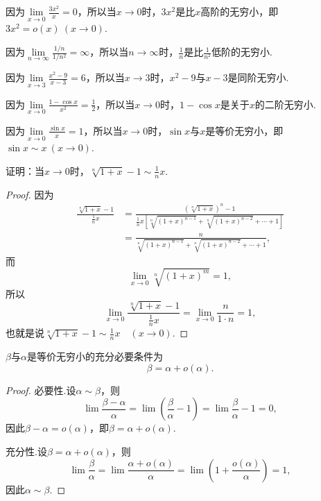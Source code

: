 \begin{example}
因为\(\lim\limits_{x\to0} \frac{3x^2}{x} = 0\)，所以当\(x\to0\)时，\(3x^2\)是比\(x\)高阶的无穷小，即\(3x^2 = o(x)\ (x\to0)\).

因为\(\lim\limits_{n\to\infty} \frac{1/n}{1/n^2} = \infty\)，所以当\(n\to\infty\)时，\(\frac{1}{n}\)是比\(\frac{1}{n^2}\)低阶的无穷小.

因为\(\lim\limits_{x\to3} \frac{x^2-9}{x-3} = 6\)，所以当\(x\to3\)时，\(x^2-9\)与\(x-3\)是同阶无穷小.

因为\(\lim\limits_{x\to0} \frac{1-\cos x}{x^2} = \frac{1}{2}\)，所以当\(x\to0\)时，\(1-\cos x\)是关于\(x\)的二阶无穷小.

因为\(\lim\limits_{x\to0} \frac{\sin x}{x} = 1\)，所以当\(x\to0\)时，\(\sin x\)与\(x\)是等价无穷小，即\(\sin x \sim x\ (x\to0)\).
\end{example}

\begin{example}
证明：当\(x\to0\)时，\(\sqrt[n]{1+x} - 1 \sim \frac{1}{n} x\).
\begin{proof}
因为\begin{align*}
\frac{\sqrt[n]{1+x} - 1}{\frac{1}{n} x}
&= \frac{(\sqrt[n]{1+x})^n - 1}{\frac{1}{n} x \left[ \sqrt[n]{(1+x)^{n-1}} + \sqrt[n]{(1+x)^{n-2}} + \dotsb + 1 \right]} \\
&= \frac{n}{\sqrt[n]{(1+x)^{n-1}} + \sqrt[n]{(1+x)^{n-2}} + \dotsb + 1},
\end{align*}
而\[
\lim\limits_{x\to0} \sqrt[n]{(1+x)^m} = 1,
\]所以\[
\lim\limits_{x\to0} \frac{\sqrt[n]{1+x} - 1}{\frac{1}{n} x} = \lim\limits_{x\to0} \frac{n}{1 \cdot n} = 1,
\]也就是说\(\sqrt[n]{1+x} - 1 \sim \frac{1}{n} x \quad(x\to0)\).
\end{proof}
\end{example}

\begin{theorem}\label{theorem:极限.无穷小的比较1}
\(\beta\)与\(\alpha\)是等价无穷小的充分必要条件为\[\beta=\alpha+o(\alpha).\]
\begin{proof}
必要性.设\(\alpha\sim\beta\)，则\[
\lim\frac{\beta-\alpha}{\alpha}
=\lim\left(\frac{\beta}{\alpha}-1\right)
=\lim\frac{\beta}{\alpha}-1 = 0,
\]因此\(\beta-\alpha=o(\alpha)\)，即\(\beta=\alpha+o(\alpha)\).

充分性.设\(\beta=\alpha+o(\alpha)\)，则\[
\lim\frac{\beta}{\alpha}
=\lim\frac{\alpha+o(\alpha)}{\alpha}
=\lim\left(1+\frac{o(\alpha)}{\alpha}\right) = 1,
\]因此\(\alpha\sim\beta\).
\end{proof}
\end{theorem}

